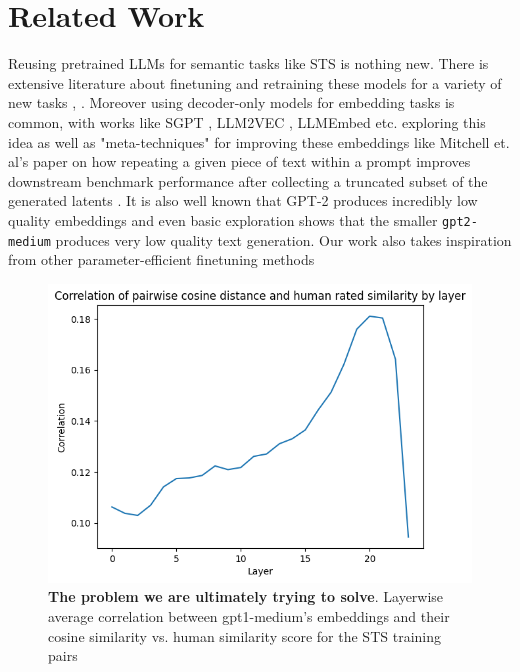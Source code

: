 \documentclass{article}
\begin{document}
\section{Related Work}
Reusing pretrained LLMs for semantic tasks like STS is nothing new. There is extensive literature about finetuning and retraining
these models for a variety of new tasks \cite{reimers2019sentencebertsentenceembeddingsusing}, \cite{tang2024poolingattentioneffectivedesigns}. Moreover using decoder-only models for embedding tasks is common, with works like
SGPT \cite{muennighoff2022sgptgptsentenceembeddings}, LLM2VEC \cite{LLM2Vec}, LLMEmbed \cite{LLMEmbed} etc. exploring this idea as well as "meta-techniques" for improving these embeddings like Mitchell et. al's paper on how repeating a given piece of text within a prompt improves downstream benchmark performance after collecting a truncated subset of the generated latents \cite{RepImprovesLLM}. It is also well known that GPT-2 produces incredibly low quality embeddings \cite{ethayarajh2019contextualcontextualizedwordrepresentations} and even basic exploration shows that the smaller \verb|gpt2-medium| produces very low quality text generation.
Our work also takes inspiration from other parameter-efficient finetuning methods


\begin{figure}[!htb]
    \centering
    \includegraphics[width=0.65\linewidth]{raw_cosine_sim.png}
    \caption{\textbf{The problem we are ultimately trying to solve}. Layerwise average correlation between gpt1-medium's embeddings and their cosine similarity vs. human similarity score for the STS training pairs}
    \label{fig:raw-corr}
\end{figure}    
\end{document}
